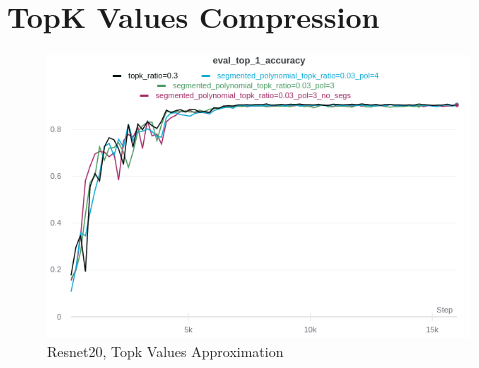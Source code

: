     \vspace{5cm}

    
    
    \section{TopK Values Compression}

    \begin{figure}[h]
    \centering
    \includegraphics[width=1\textwidth]{thesis/figures/segmented_pol_topk.png}
    \caption{Resnet20, Topk Values Approximation}
    \label{resnet_val_approx}
    \end{figure}

    
